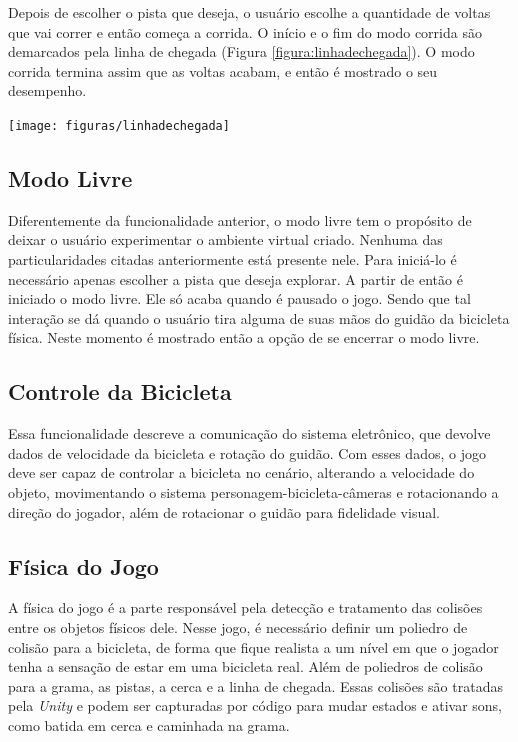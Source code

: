 Depois de escolher o pista que deseja, o usuário escolhe a quantidade de voltas que vai correr e então começa a corrida. O início e o fim do modo corrida são demarcados pela linha de chegada (Figura \ref{figura:linhadechegada}). O modo corrida termina assim que as voltas acabam, e então é mostrado o seu desempenho.

\begin{center}
	\texttt{[image: figuras/linhadechegada]}
	\label{figura:linhadechegada}
\end{center}

\subsection{Modo Livre}
\label{livre}
Diferentemente da funcionalidade anterior, o modo livre tem o propósito de deixar o usuário experimentar o ambiente virtual criado. Nenhuma das particularidades citadas anteriormente está presente nele. Para iniciá-lo é necessário apenas escolher a pista que deseja explorar. A partir de então é iniciado o modo livre. Ele só acaba quando é pausado o jogo. Sendo que tal interação se dá quando o usuário tira alguma de suas mãos do guidão da bicicleta física. Neste momento é mostrado então a opção de se encerrar o modo livre.

\subsection{Controle da Bicicleta}
Essa funcionalidade descreve a comunicação do sistema eletrônico, que devolve dados de velocidade da bicicleta e rotação do guidão. Com esses dados, o jogo deve ser capaz de controlar a bicicleta no cenário, alterando a velocidade do objeto, movimentando o sistema personagem-bicicleta-câmeras e rotacionando a direção do jogador, além de rotacionar o guidão para fidelidade visual.

\subsection{Física do Jogo}
A física do jogo é a parte responsável pela detecção e tratamento das colisões entre os objetos físicos dele. Nesse jogo, é necessário definir um poliedro de colisão para a bicicleta, de forma que fique realista a um nível em que o jogador tenha a sensação de estar em uma bicicleta real. Além de poliedros de colisão para a grama, as pistas, a cerca e a linha de chegada. Essas colisões são tratadas pela \textit{Unity} e podem ser capturadas por código para mudar estados e ativar sons, como batida em cerca e caminhada na grama.

